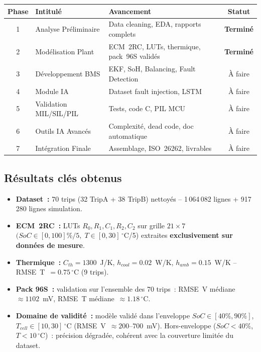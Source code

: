 \documentclass[a4paper,12pt]{article}
\begin{document}
\vspace{4pt}
\begin{center}
\renewcommand{\arraystretch}{1.4}
\begin{tabular}{c p{4cm} p{5.5cm} c}
\toprule
\textbf{Phase} & \textbf{Intitulé} & \textbf{Avancement} & \textbf{Statut} \\
\midrule
1 & Analyse Préliminaire & Data cleaning, EDA, rapports complets & \textcolor{statusdone}{\textbf{Terminé}} \\
2 & Modélisation Plant & ECM~2RC, LUTs, thermique, pack~96S validés & \textcolor{statusdone}{\textbf{Terminé}} \\
3 & Développement BMS & EKF, SoH, Balancing, Fault Detection & \textcolor{statustodo}{À faire} \\
4 & Module IA & Dataset fault injection, LSTM & \textcolor{statustodo}{À faire} \\
5 & Validation MIL/SIL/PIL & Tests, code C, PIL MCU & \textcolor{statustodo}{À faire} \\
6 & Outils IA Avancés & Complexité, dead code, doc automatique & \textcolor{statustodo}{À faire} \\
7 & Intégration Finale & Assemblage, ISO~26262, livrables & \textcolor{statustodo}{À faire} \\
\bottomrule
\end{tabular}
\end{center}

\subsection*{Résultats clés obtenus}
\begin{itemize}[nosep]
  \item \textbf{Dataset~:} 70 trips (32 TripA + 38 TripB) nettoyés -- 1\,064\,082 lignes + 917\,280 lignes simulation.
  \item \textbf{ECM~2RC~:} LUTs $R_0, R_1, C_1, R_2, C_2$ sur grille $21\times7$ $(SoC \in [0,100]\%/5,\; T \in [0,30]\,^{\circ}$C/5) extraites \textbf{exclusivement sur données de mesure}.
  \item \textbf{Thermique~:} $C_{th}=1300$~J/K, $h_{cool}=0.02$~W/K, $h_{amb}=0.15$~W/K -- RMSE~T~$=0.75\,^{\circ}$C (9 trips).
  \item \textbf{Pack 96S~:} validation sur l'ensemble des 70 trips~: RMSE~V médiane~$\approx 1102$~mV, RMSE~T médiane~$\approx 1.18\,^{\circ}$C.
  \item \textbf{Domaine de validité~:} modèle validé dans l'enveloppe $SoC \in [40\%, 90\%]$, $T_{cell} \in [10, 30]\,^{\circ}$C (RMSE~V~$\approx 200$--$700$~mV). Hors-enveloppe ($SoC < 40\%$, $T < 10\,^{\circ}$C)~: précision dégradée, cohérent avec la couverture limitée du dataset.
\end{itemize}
\end{document}
